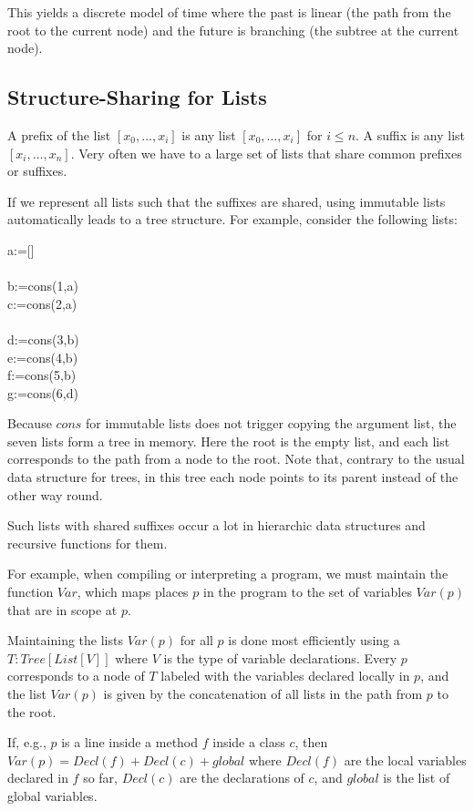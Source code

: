 This yields a discrete model of time where the past is linear (the path from the root to the current node) and the future is branching (the subtree at the current node).

\subsection{Structure-Sharing for Lists}

A prefix of the list $[x_0,\ldots,x_i]$ is any list $[x_0,\ldots,x_i]$ for $i\leq n$.
A suffix is any list $[x_i,\ldots,x_n]$.
Very often we have to a large set of lists that share common prefixes or suffixes.

If we represent all lists such that the suffixes are shared, using immutable lists automatically leads to a tree structure.
For example, consider the following lists:
\begin{acode}
a:=[]\\
\\
b:=cons(1,a)\\
c:=cons(2,a)\\
\\
d:=cons(3,b)\\
e:=cons(4,b)\\
f:=cons(5,b)\\
g:=cons(6,d)
\end{acode}
Because $cons$ for immutable lists does not trigger copying the argument list, the seven lists form a tree in memory.
Here the root is the empty list, and each list corresponds to the path from a node to the root.
Note that, contrary to the usual data structure for trees, in this tree each node points to its parent instead of the other way round.

Such lists with shared suffixes occur a lot in hierarchic data structures and recursive functions for them.

For example, when compiling or interpreting a program, we must maintain the function $Var$, which maps places $p$ in the program to the set of variables $Var(p)$ that are in scope at $p$.

Maintaining the lists $Var(p)$ for all $p$ is done most efficiently using a $T:Tree[List[V]]$ where $V$ is the type of variable declarations.
Every $p$ corresponds to a node of $T$ labeled with the variables declared locally in $p$, and the list $Var(p)$ is given by the concatenation of all lists in the path from $p$ to the root.

If, e.g., $p$ is a line inside a method $f$ inside a class $c$, then $Var(p)=Decl(f)+Decl(c)+global$ where $Decl(f)$ are the local variables declared in $f$ so far, $Decl(c)$ are the declarations of $c$, and $global$ is the list of global variables.




